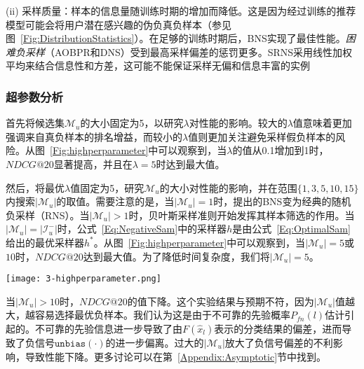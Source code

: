 (ii) 采样质量：样本的信息量随训练时期的增加而降低。这是因为经过训练的推荐模型可能会将用户潜在感兴趣的伪负真负样本（参见图~\ref{Fig:DistributionStatistics}）。在足够的训练时期后，\textsf{BNS}实现了最佳性能。\textit{困难负采样}（\textsf{AOBPR}和\textsf{DNS}）受到最高采样偏差的惩罚更多。\textsf{SRNS}采用线性加权平均来结合信息性和方差，这可能不能保证采样无偏和信息丰富的实例

\subsubsection{超参数分析}\label{Appendix:Selection}
首先将候选集$\mathcal{M}_u$的大小固定为5，以研究$\lambda$对性能的影响。较大的$\lambda$值意味着更加强调来自真负样本的排名增益，而较小的$\lambda$值则更加关注避免采样假负样本的风险。从图~\ref{Fig:highperparameter}中可以观察到，当$\lambda$的值从0.1增加到1时，$NDCG@20$显著提高，并且在$\lambda=5$时达到最大值。

然后，将最优$\lambda$值固定为5，研究$\mathcal{M}_u$的大小对性能的影响，并在范围$\{1, 3, 5, 10, 15\}$内搜索$|\mathcal{M}_u|$的取值。需要注意的是，当$|\mathcal{M}_u|=1$时，提出的\textsf{BNS}变为经典的随机负采样（\textsf{RNS}）。当$|\mathcal{M}_u|>1$时，贝叶斯采样准则开始发挥其样本筛选的作用。当$|\mathcal{M}_u|=|\mathcal{I}_u^-|$时，公式~\eqref{Eq:NegativeSam}中的采样器$h$是由公式~\eqref{Eq:OptimalSam}给出的最优采样器$h^*$。从图~\ref{Fig:highperparameter}中可以观察到，当$|\mathcal{M}_u|=5$或$10$时，$NDCG@20$达到最大值。为了降低时间复杂度，我们将$|\mathcal{M}_u|=5$。

\begin{figure*}[!]
	\centering
	\texttt{[image: 3-highperparameter.png]}
	\caption{参数$\lambda$和$|\mathcal{M}_u|$的影响}
	\label{Fig:highperparameter}
\end{figure*}
当$|\mathcal{M}_u| > 10$时，$NDCG@20$的值下降。这个实验结果与预期不符，因为$|\mathcal{M}_u|$值越大，越容易选择最优负样本。我们认为这是由于不可靠的先验概率$P_{fn}(l)$估计引起的。不可靠的先验信息进一步导致了由$F(\hat{x}_l)$表示的分类结果的偏差，进而导致了负信号$\mathtt{unbias}(\cdot)$的进一步偏离。过大的$|\mathcal{M}_u|$放大了负信号偏差的不利影响，导致性能下降。更多讨论可以在第~\ref{Appendix:Asymptotic}节中找到。

